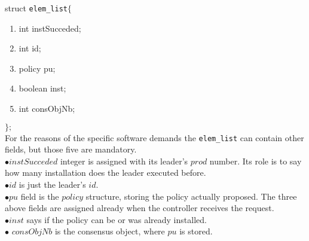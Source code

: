 \documentclass{article}
\theoremstyle{remark}
\begin{document}
struct \texttt{elem\_list}$\lbrace$
\begin{enumerate}
\item int instSucceded;
\item int id;
\item policy pu;
\item boolean inst;
\item int consObjNb;
\end{enumerate}
$\rbrace ;$\\
For the reasons of the specific software demands the \texttt{elem\_list} can contain other fields, but those five are mandatory.\\
$\bullet instSucceded$ integer is assigned with its leader's $prod$ number. Its role is to say how many installation does the leader executed before. \\
$\bullet id$ is just the leader's $id$.\\
$\bullet pu$ field is the $policy$ structure, storing the policy actually proposed. The three above fields are assigned already when the controller receives the request.\\
$\bullet inst$ says if the policy can be or was already installed.\\
$\bullet$ $consObjNb$ is the consensus object, where $pu$ is stored.\\

\end{document}
